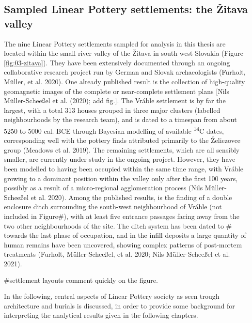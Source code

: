 \documentclass[
  12pt,
  a4paper, twoside]{book}
\begin{document}
\hypertarget{sampled-linear-pottery-settlements-the-ux17eitava-valley}{%
\subsection{Sampled Linear Pottery settlements: the Žitava valley}\label{sampled-linear-pottery-settlements-the-ux17eitava-valley}}

The nine Linear Pottery settlements sampled for analysis in this thesis are located within the small river valley of the Žitava in south-west Slovakia (Figure \ref{fig:03-zitava}). They have been extensively documented through an ongoing collaborative research project run by German and Slovak archaeologists (Furholt, Müller, et al. 2020). One already published result is the collection of high-quality geomagnetic images of the complete or near-complete settlement plans {[}Nils Müller-Scheeßel et al. (2020); add fig.{]}. The Vráble settlement is by far the largest, with a total 313 houses grouped in three major clusters (labelled neighbourhoods by the research team), and is dated to a timespan from about 5250 to 5000 cal. BCE through Bayesian modelling of available \textsuperscript{14}C dates, corresponding well with the pottery finds attributed primarily to the Želiezovce group (Meadows et al. 2019). The remaining settlements, which are all sensibly smaller, are currently under study in the ongoing project. However, they have been modelled to having been occupied within the same time range, with Vráble growing to a dominant position within the valley only after the first 100 years, possibly as a result of a micro-regional agglomeration process (Nils Müller-Scheeßel et al. 2020). Among the published results, is the finding of a double enclosure ditch surrounding the south-west neighbourhood of Vráble (not included in Figure\#), with at least five entrance passages facing away from the two other neighbourhoods of the site. The ditch system has been dated to \# towards the last phase of occupation, and in the infill deposits a large quantity of human remains have been uncovered, showing complex patterns of post-mortem treatments (Furholt, Müller-Scheeßel, et al. 2020; Nils Müller-Scheeßel et al. 2021).

\#settlement layouts comment quickly on the figure.

In the following, central aspects of Linear Pottery society as seen trough architecture and burials is discussed, in order to provide some background for interpreting the analytical results given in the following chapters.
\end{document}

